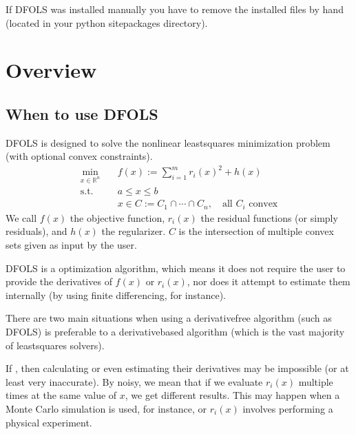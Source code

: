 \documentclass[letterpaper,10pt,english]{sphinxmanual}
\begin{document}
\sphinxAtStartPar
If DFO\sphinxhyphen{}LS was installed manually you have to remove the installed files by hand (located in your python site\sphinxhyphen{}packages directory).

\sphinxstepscope


\chapter{Overview}
\label{\detokenize{info:overview}}\label{\detokenize{info::doc}}

\section{When to use DFO\sphinxhyphen{}LS}
\label{\detokenize{info:when-to-use-dfo-ls}}
\sphinxAtStartPar
DFO\sphinxhyphen{}LS is designed to solve the nonlinear least\sphinxhyphen{}squares minimization problem (with optional convex constraints).
\begin{equation*}
\begin{split}\min_{x\in\mathbb{R}^n}  &\quad  f(x) := \sum_{i=1}^{m}r_{i}(x)^2 + h(x) \\
\text{s.t.} &\quad  a \leq x \leq b\\
            &\quad x \in C := C_1 \cap \cdots \cap C_n, \quad \text{all $C_i$ convex}\end{split}
\end{equation*}
\sphinxAtStartPar
We call \(f(x)\) the objective function, \(r_i(x)\) the residual functions (or simply residuals), and \(h(x)\) the regularizer.
\(C\) is the intersection of multiple convex sets given as input by the user.

\sphinxAtStartPar
DFO\sphinxhyphen{}LS is a  optimization algorithm, which means it does not require the user to provide the derivatives of \(f(x)\) or \(r_i(x)\), nor does it attempt to estimate them internally (by using finite differencing, for instance).

\sphinxAtStartPar
There are two main situations when using a derivative\sphinxhyphen{}free algorithm (such as DFO\sphinxhyphen{}LS) is preferable to a derivative\sphinxhyphen{}based algorithm (which is the vast majority of least\sphinxhyphen{}squares solvers).

\sphinxAtStartPar
If , then calculating or even estimating their derivatives may be impossible (or at least very inaccurate). By noisy, we mean that if we evaluate \(r_i(x)\) multiple times at the same value of \(x\), we get different results. This may happen when a Monte Carlo simulation is used, for instance, or \(r_i(x)\) involves performing a physical experiment.
\end{document}

